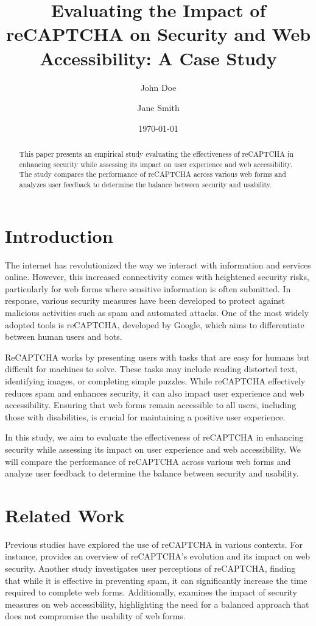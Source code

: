 \documentclass{article}
\title{Evaluating the Impact of reCAPTCHA on Security and Web Accessibility: A Case Study}
\author{John Doe \and Jane Smith}
\date{\today}
\begin{document}
\maketitle

\begin{abstract}
This paper presents an empirical study evaluating the effectiveness of reCAPTCHA in enhancing security while assessing its impact on user experience and web accessibility. The study compares the performance of reCAPTCHA across various web forms and analyzes user feedback to determine the balance between security and usability.
\end{abstract}

\section{Introduction}
The internet has revolutionized the way we interact with information and services online. However, this increased connectivity comes with heightened security risks, particularly for web forms where sensitive information is often submitted. In response, various security measures have been developed to protect against malicious activities such as spam and automated attacks. One of the most widely adopted tools is reCAPTCHA, developed by Google, which aims to differentiate between human users and bots.

ReCAPTCHA works by presenting users with tasks that are easy for humans but difficult for machines to solve. These tasks may include reading distorted text, identifying images, or completing simple puzzles. While reCAPTCHA effectively reduces spam and enhances security, it can also impact user experience and web accessibility. Ensuring that web forms remain accessible to all users, including those with disabilities, is crucial for maintaining a positive user experience.

In this study, we aim to evaluate the effectiveness of reCAPTCHA in enhancing security while assessing its impact on user experience and web accessibility. We will compare the performance of reCAPTCHA across various web forms and analyze user feedback to determine the balance between security and usability.

\section{Related Work}
Previous studies have explored the use of reCAPTCHA in various contexts. For instance, \cite{reCaptchaSurvey} provides an overview of reCAPTCHA's evolution and its impact on web security. Another study \cite{userExperience} investigates user perceptions of reCAPTCHA, finding that while it is effective in preventing spam, it can significantly increase the time required to complete web forms. Additionally, \cite{accessibilityImpact} examines the impact of security measures on web accessibility, highlighting the need for a balanced approach that does not compromise the usability of web forms.
\end{document}
